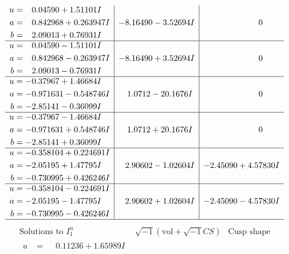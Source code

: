 \documentclass[1p]{elsarticle_modified}
\theoremstyle{definition}
\newcommand{\I}{\sqrt{-1}}
\begin{document}
$$\begin{array}{c|c|c}
\begin{aligned}
u &= \phantom{-}0.04590 + 1.51101 I \\
a &= \phantom{-}0.842968 + 0.263947 I \\
b &= \phantom{-}2.09013 + 0.76931 I\end{aligned}
 & -8.16490 - 3.52694 I & \phantom{-0.000000 } 0 \\ \hline\begin{aligned}
u &= \phantom{-}0.04590 - 1.51101 I \\
a &= \phantom{-}0.842968 - 0.263947 I \\
b &= \phantom{-}2.09013 - 0.76931 I\end{aligned}
 & -8.16490 + 3.52694 I & \phantom{-0.000000 } 0 \\ \hline\begin{aligned}
u &= -0.37967 + 1.46684 I \\
a &= -0.971631 - 0.548746 I \\
b &= -2.85141 - 0.36099 I\end{aligned}
 & \phantom{-}1.0712 - 20.1676 I & \phantom{-0.000000 } 0 \\ \hline\begin{aligned}
u &= -0.37967 - 1.46684 I \\
a &= -0.971631 + 0.548746 I \\
b &= -2.85141 + 0.36099 I\end{aligned}
 & \phantom{-}1.0712 + 20.1676 I & \phantom{-0.000000 } 0 \\ \hline\begin{aligned}
u &= -0.358104 + 0.224691 I \\
a &= -2.05195 + 1.47795 I \\
b &= -0.730995 + 0.426246 I\end{aligned}
 & \phantom{-}2.90602 - 1.02604 I & -2.45090 + 4.57830 I \\ \hline\begin{aligned}
u &= -0.358104 - 0.224691 I \\
a &= -2.05195 - 1.47795 I \\
b &= -0.730995 - 0.426246 I\end{aligned}
 & \phantom{-}2.90602 + 1.02604 I & -2.45090 - 4.57830 I\\
 \hline 
 \end{array}$$\newpage$$\begin{array}{c|c|c}  
\text{Solutions to }I^u_{1}& \I (\text{vol} + \sqrt{-1}CS) & \text{Cusp shape}\\
 \hline 
\begin{aligned}
u &= \phantom{-}0.11236 + 1.65989 I \\

\end{aligned}
\end{array}$$
\end{document}
